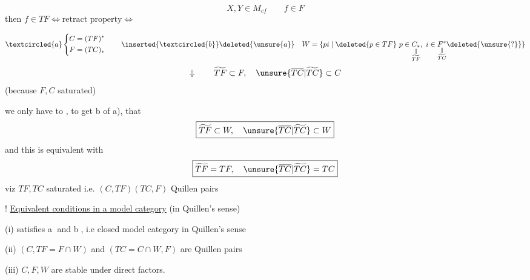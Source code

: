 

\[
X,Y\in M_{cf}\qquad f\in F
\]
then $f\in TF\Longleftrightarrow\text{retract property}\Longleftrightarrow$


\[
\textcircled{a}\left\{\begin{aligned}C&=(TF)^*\\F&=(TC)_*\end{aligned}\right.
\qquad
\inserted{\textcircled{b}}\deleted{\unsure{a}}\quad
W=\{pi\mid\deleted{p\in TF}\ p\in\underset{\substack{\Vert\\\widetilde{TF}}}{C_*},\ i\in\underset{\substack{\Vert\\\widetilde{TC}}}{F^*}\deleted{\unsure{?}}\}
\]
\[
\Downarrow\qquad
\widetilde{TF}\subset F,\quad \unsure{\overline{TC}|\widetilde{TC}}\subset C
\]
(because $F,C$ saturated) 


we only have to  , to get b  of a), that 
\[
\boxed{\widetilde{TF}\subset W,\quad\unsure{\overline{TC}|\widetilde{TC}}\subset W}
\]
and this is equivalent with
\[
\boxed{\widetilde{TF}=TF,\quad\unsure{\overline{TC}|\widetilde{TC}}=TC}
\]
viz $TF,TC$ saturated i.e. $(C,TF)(TC,F)$ Quillen pairs

! \uline{Equivalent conditions in a model category} (in Quillen's sense)


(i) satisfies \textcircled{a} and \textcircled{b}, i.e closed model category in Quillen's sense

(ii) $(C,TF=F\cap W)$ and $(TC=C\cap W,F)$ are Quillen pairs

(iii) $C,F,W$ are stable under direct factors.

